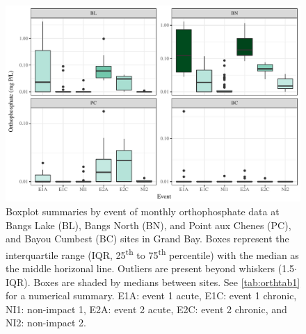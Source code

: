 \documentclass[letterpaper,12pt]{article}\usepackage[]{graphicx}\usepackage[]{color}
\makeatletter
\def\maxwidth{ %
  \ifdim\Gin@nat@width>\linewidth
    \linewidth
  \else
    \Gin@nat@width
  \fi
}
\makeatother
\begin{document}
\setcounter{figure}{5}
\begin{figure}[!ht]

{\centering \includegraphics[width=\maxwidth]{figs/Fig6} 

}

\caption{Boxplot summaries by event of monthly orthophosphate data at Bangs Lake (BL), Bangs North (BN), and Point aux Chenes (PC), and Bayou Cumbest (BC) sites in Grand Bay.  Boxes represent the interquartile range (IQR, 25\textsuperscript{th} to 75\textsuperscript{th} percentile) with the median as the middle horizonal line.  Outliers are present beyond whiskers (1.5$\cdot$IQR). Boxes are shaded by medians between sites.  See \cref{tab:orthtab1} for a numerical summary. E1A: event 1 acute, E1C: event 1 chronic, NI1: non-impact 1, E2A: event 2 acute, E2C: event 2 chronic, and NI2: non-impact 2.}\label{fig:Fig6}
\end{figure}


\clearpage
\end{document}
